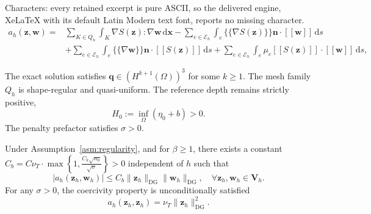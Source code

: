 \documentclass[10pt,a4paper]{amsart}
\begin{document}
Characters: every retained excerpt is pure ASCII, so the delivered engine, XeLaTeX with its default Latin Modern text font, reports no missing character.
\begin{equation}
\label{eq7}
\begin{aligned}
a_h(\mathbf z,\mathbf w)
={}&\sum_{K\in Q_h}\int_K\nabla S(\mathbf z):\nabla\mathbf w\,\mathrm d\mathbf x
-\sum_{e\in\mathcal E_h}\int_e\{\!\{\nabla S(\mathbf z)\}\!\}\mathbf n\cdot[[\mathbf w]]\,\mathrm ds\\
&+\sum_{e\in\mathcal E_h}\int_e\{\!\{\nabla\mathbf w\}\!\}\mathbf n\cdot[[S(\mathbf z)]]\,\mathrm ds
+\sum_{e\in\mathcal E_h}\int_e\mu_e[[S(\mathbf z)]]\cdot[[\mathbf w]]\,\mathrm ds,
\end{aligned}
\end{equation}

\begin{assumption}
\label{asm:regularity}
The exact solution satisfies $\mathbf{q}\in \left(H^{k+1}(\Omega)\right)^3$ for some $k\ge 1$. The mesh family $Q_h$ is shape-regular and quasi-uniform. The reference depth remains strictly positive,
\[
H_0:=\inf_{\Omega}(\eta_0+b)>0.
\]
The penalty prefactor satisfies $\sigma > 0$.
\end{assumption}

\begin{lemma}
\label{lma:coercivity}
Under Assumption~\ref{asm:regularity}, and for $\beta\ge 1$, there exists a constant $C_b=C \nu_T \cdot \max \left\{1,\frac{C_k \sqrt{n_0}}{\sqrt{\sigma}}\right\}>0$ independent of $h$ such that
\begin{equation}
\label{eq13}
|a_h(\mathbf{z}_h,\mathbf{w}_h)|
\le C_b\|\mathbf{z}_h\|_{\mathrm{DG}}\|\mathbf{w}_h\|_{\mathrm{DG}},
\quad
\forall \mathbf{z}_h,\mathbf{w}_h\in\mathbf{V}_h.
\end{equation}
For any $\sigma>0$, the coercivity property is unconditionally satisfied
\begin{equation}
\label{eq14}
a_h(\mathbf{z}_h,\mathbf{z}_h)=\nu_T\|\mathbf{z}_h\|_{\mathrm{DG}}^2.
\end{equation}
\end{lemma}
\end{document}

